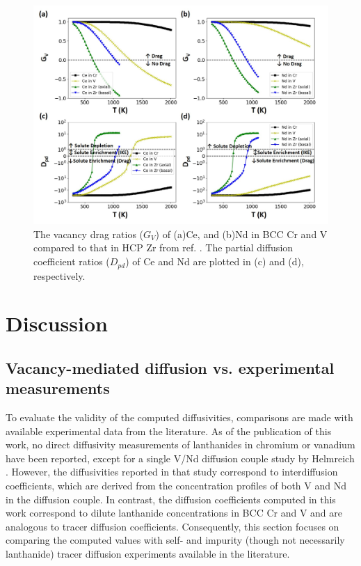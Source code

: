 \documentclass[preprint,12pt]{elsarticle}
\providecommand{\DIFaddbeginFL}{} %
\providecommand{\DIFaddendFL}{} %
\providecommand{\DIFdelbeginFL}{} %
\providecommand{\DIFdelendFL}{} %
\newcommand{\DIFscaledelfig}{0.5}
\newlength{\DIFdelgraphicswidth} %
\newlength{\DIFdelgraphicsheight} %
\newcommand{\DIFaddincludegraphics}[2][]{{\color{blue}\fbox{\DIFOincludegraphics[#1]{#2}}}} %
\newcommand{\DIFdelincludegraphics}[2][]{%
\sbox{\DIFdelgraphicsbox}{\DIFOincludegraphics[#1]{#2}}%
\settoboxwidth{\DIFdelgraphicswidth}{\DIFdelgraphicsbox} %
\settoboxtotalheight{\DIFdelgraphicsheight}{\DIFdelgraphicsbox} %
\scalebox{\DIFscaledelfig}{%
\parbox[b]{\DIFdelgraphicswidth}{\usebox{\DIFdelgraphicsbox}\\[-\baselineskip] \rule{\DIFdelgraphicswidth}{0em}}\llap{\resizebox{\DIFdelgraphicswidth}{\DIFdelgraphicsheight}{%
\setlength{\unitlength}{\DIFdelgraphicswidth}%
\begin{picture}(1,1)%
\thicklines\linethickness{2pt} %
{\color[rgb]{1,0,0}\put(0,0){\framebox(1,1){}}}%
{\color[rgb]{1,0,0}\put(0,0){\line( 1,1){1}}}%
{\color[rgb]{1,0,0}\put(0,1){\line(1,-1){1}}}%
\end{picture}%
}\hspace*{3pt}}} %
} %
\DeclareRobustCommand{\DIFaddbeginFL}{\DIFOaddbeginFL \let\includegraphics\DIFaddincludegraphics} %
\DeclareRobustCommand{\DIFaddendFL}{\DIFOaddendFL \let\includegraphics\DIFOincludegraphics} %
\DeclareRobustCommand{\DIFdelbeginFL}{\DIFOdelbeginFL \let\includegraphics\DIFdelincludegraphics} %
\DeclareRobustCommand{\DIFdelendFL}{\DIFOaddendFL \let\includegraphics\DIFOincludegraphics} %
\begin{document}
\begin{figure}[h]
    \centering
    \DIFdelbeginFL %
\DIFdelendFL \DIFaddbeginFL \includegraphics[width=0.9\linewidth]{drag_ratios_pdc_cr_v.jpg}
    \DIFaddendFL \caption{The vacancy drag ratios ($G_V$) of (a)Ce, and (b)Nd in BCC Cr and V compared to that in HCP Zr from ref. \cite{shousha2024first}. The partial diffusion coefficient ratios ($D_{pd}$) of Ce and Nd are plotted in (c) and (d), respectively.}
    \label{fig:drag_cr_v}
\end{figure}

\FloatBarrier
\section{Discussion}

\subsection{Vacancy-mediated diffusion vs. experimental measurements}

To evaluate the validity of the computed diffusivities, comparisons are made with available experimental data from the literature. As of the publication of this work, no direct diffusivity measurements of lanthanides in chromium or vanadium have been reported, except for a single V/Nd diffusion couple study by Helmreich \cite{helmreich_diffusion_2014}. However, the diffusivities reported in that study correspond to interdiffusion coefficients, which are derived from the concentration profiles of both V and Nd in the diffusion couple. In contrast, the diffusion coefficients computed in this work correspond to dilute lanthanide concentrations in BCC Cr and V and are analogous to tracer diffusion coefficients. Consequently, this section focuses on comparing the computed values with self- and impurity (though not necessarily lanthanide) tracer diffusion experiments available in the literature.
\end{document}
